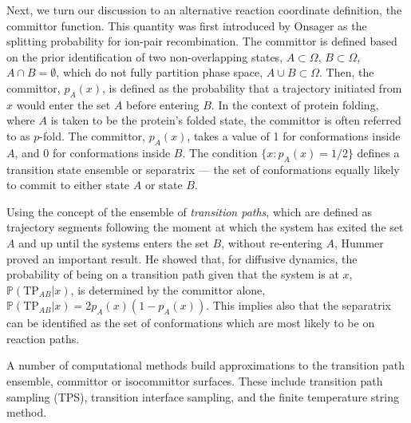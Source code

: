 \documentclass[aip, jcp, reprint, nolinenumbers, twocolumn, nobalancelastpage, nofootinbib]{revtex4-1}
\begin{document}


Next, we turn our discussion to an alternative reaction coordinate definition, the committor function. This quantity was first introduced by Onsager as the splitting probability for ion-pair recombination.\cite{PhysRev.54.554} The committor is defined based on the prior identification of two non-overlapping states, $A \subset \Omega$, $B \subset \Omega$, $A \cap B = \emptyset$, which do not fully partition phase space, $A \cup B \subset \Omega$. Then, the committor, $p_A(x)$, is defined as the probability that a trajectory initiated from $x$ would enter the set $A$ before entering $B$.\cite{Bolhuis2002TRANSITION, dellago2002transition} In the context of protein folding, where $A$ is taken to be the protein's folded state, the committor is often referred to as $p$-fold.\cite{Du1998transition, pande199pathways} The committor, $p_A(x)$, takes a value of 1 for conformations inside $A$, and 0 for conformations inside $B$. The condition $\{x : p_A(x)=1/2\}$ defines a transition state ensemble or separatrix --- the set of conformations equally likely to commit to either state $A$ or state $B$.

Using the concept of the ensemble of \emph{transition paths}, which are defined as trajectory segments following the moment at which the system has exited the set $A$ and up until the systems enters the set $B$, without re-entering $A$, Hummer proved an important result.\cite{hummer2004from} He showed that, for diffusive dynamics, the probability of being on a transition path given that the system is at $x$, $\mathbb{P}(\mathrm{TP}_{AB}|x)$, is determined by the committor alone, $\mathbb{P}(\mathrm{TP}_{AB}|x) = 2p_A(x)(1-p_A(x))$. This implies also that the separatrix can be identified as the set of conformations which are most likely to be on reaction paths.

A number of computational methods build approximations to the transition path ensemble, committor or isocommittor surfaces. These include transition path sampling (TPS),\cite{dellago2002transition, Bolhuis2002TRANSITION} transition interface sampling,\cite{vanErp2005157}  and the finite temperature string method.\cite{weinan2005transition, e2005finite}
\end{document}
